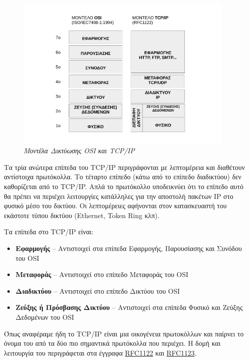 \begin{figure}[!ht]
  \centering
  \includegraphics[width=0.95\textwidth]{images/chapter1/1-1}
  \caption {\textsl{Μοντέλα Δικτύωσης OSI και TCP/IP}}
  \label{1-1}
\end{figure}

Τα τρία ανώτερα επίπεδα του TCP/IP περιγράφονται με λεπτομέρεια και διαθέτουν αντίστοιχα πρωτόκολλα.
Το τέταρτο επίπεδο (κάτω από το επίπεδο διαδικτύου) δεν καθορίζεται από το TCP/IP. Απλά το πρωτόκολλο
υποδεικνύει ότι το επίπεδο αυτό θα πρέπει να περιέχει λειτουργίες κατάλληλες για την αποστολή πακέτων
IP στο φυσικό μέσο του δικτύου. Οι λεπτομέρειες αφήνονται στον κατασκευαστή του εκάστοτε τύπου δικτύου (Ethernet, Token Ring κλπ).

Τα επίπεδα στο TCP/IP είναι:

\begin{itemize}
\item \textbf{Εφαρμογής} -- Αντιστοιχεί στα επίπεδα Εφαρμογής, Παρουσίασης και Συνόδου του OSI
\item \textbf{Μεταφοράς} -- Αντιστοιχεί στο επίπεδο Μεταφοράς του OSI
\item \textbf{Διαδικτύου} -- Αντιστοιχεί στο επίπεδο Δικτύου του OSI
\item \textbf{Ζεύξης ή Πρόσβασης Δικτύου} -- Αντιστοιχεί στα επίπεδα Φυσικό και Ζεύξης Δεδομένων του OSI
\end{itemize}

Όπως αναφέραμε ήδη το TCP/IP είναι μια οικογένεια πρωτοκόλλων και παίρνει το όνομα του από τα δύο πιο σημαντικά πρωτόκολλα που περιέχει. Η δομή και λειτουργία του περιγράφεται στα έγγραφα \href{https://tools.ietf.org/html/rfc1122}{RFC1122} και \href{https://tools.ietf.org/html/rfc1123}{RFC1123}.

